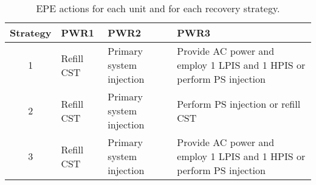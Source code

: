 \begin{table}
  \begin{tabular}{|c|l|l|p{5cm}|}
     \hline
       \textbf{Strategy} &  \textbf{PWR1}       &  \textbf{PWR2}         &  \textbf{PWR3}    \\ 
       \hline \hline                                                              
       1        & Refill CST & Primary system injection & Provide AC power and employ 1 LPIS and 1 HPIS or perform PS injection  \\ \hline
       2        & Refill CST & Primary system injection & Perform PS injection or refill CST                                     \\ \hline
       3        & Refill CST & Primary system injection & Provide AC power and employ 1 LPIS and 1 HPIS or perform PS injection  \\ \hline
  \end{tabular}
  \caption{EPE actions for each unit and for each recovery strategy.}
  \label{tab:EPEactions}
\end{table} 

